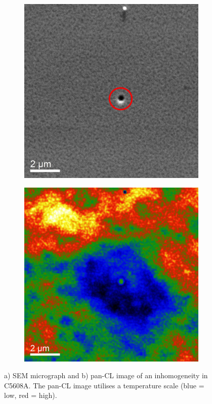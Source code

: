 \begin{figure}[h]
	
	\begin{subfigure}[b]{0.48\textwidth}
		\centering
		\includegraphics[width=0.7\linewidth]{Figs/Ch3/5608sem}
		\caption{}
		
	\end{subfigure}%
	\hspace*{0.5cm}
	\begin{subfigure}[b]{0.48\textwidth}
		\centering
		\includegraphics[width=0.7\linewidth]{Figs/Ch3/5608panCL}
		\caption{}
	\end{subfigure}%
	
	\caption{a) SEM micrograph and b) pan-CL image of an inhomogeneity in C5608A. The pan-CL image utilises a temperature scale (blue = low, red = high).}
	\label{5608-SEM-CL}
\end{figure}
\FloatBarrier

